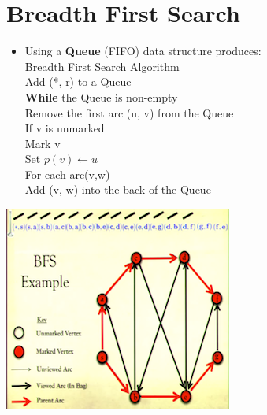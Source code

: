 \documentclass[12pt]{article}
\newcommand{\forceindent}{\leavevmode{\parindent=1em\indent}}
\begin{document}
\section{Breadth First Search}
\renewcommand{\labelitemii}{$\circ$}
\renewcommand{\labelitemiii}{$\cdot$}
\renewcommand{\labelitemiii}{$\rightarrow$}
\renewcommand{\labelitemiv}{$\star$}
\begin{itemize}
\item Using a \textbf{Queue} (FIFO) data structure produces:\\
\underline{Breadth First Search Algorithm}\\
Add (*, r) to a Queue\\
\forceindent \textbf{While} the Queue is non-empty\\
\forceindent \forceindent Remove the first arc (u, v) from the Queue\\
\forceindent \forceindent If v is unmarked \\
\forceindent \forceindent \forceindent Mark v\\
\forceindent \forceindent \forceindent Set $p(v) \leftarrow u$ \\ 
\forceindent \forceindent \forceindent For each arc(v,w)\\
\forceindent \forceindent \forceindent \forceindent Add (v, w) into the back of the Queue
\end{itemize}
\begin{center}
\includegraphics{lecture82}
\end{center}
\end{document}
